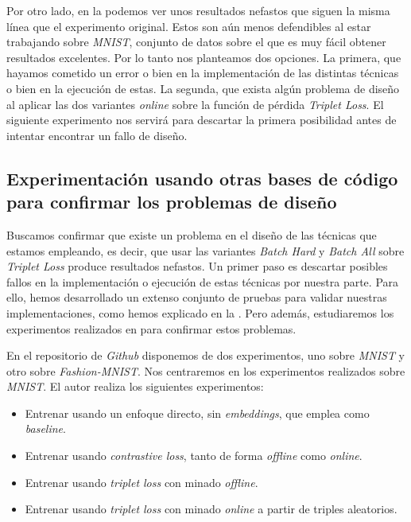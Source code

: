 Por otro lado, en la  podemos ver unos resultados nefastos que siguen la misma línea que el experimento original. Estos son aún menos defendibles al estar trabajando sobre \textit{MNIST}, conjunto de datos sobre el que es muy fácil obtener resultados excelentes. Por lo tanto nos planteamos dos opciones. La primera, que hayamos cometido un error o bien en la implementación de las distintas técnicas o bien en la ejecución de estas. La segunda, que exista algún problema de diseño al aplicar las dos variantes \textit{online} sobre la función de pérdida \textit{Triplet Loss}. El siguiente experimento nos servirá para descartar la primera posibilidad antes de intentar encontrar un fallo de diseño.

\subsection{Experimentación usando otras bases de código para confirmar los problemas de diseño} \label{isubsec:experiemntacion_base_codigo_externa}

Buscamos confirmar que existe un problema en el diseño de las técnicas que estamos empleando, es decir, que usar las variantes \textit{Batch Hard} y \textit{Batch All} sobre \textit{Triplet Loss} produce resultados nefastos. Un primer paso es descartar posibles fallos en la implementación o ejecución de estas técnicas por nuestra parte. Para ello, hemos desarrollado un extenso conjunto de pruebas para validar nuestras implementaciones, como hemos explicado en la . Pero además, estudiaremos los experimentos realizados en \cite{informatica:adambielski_github} para confirmar estos problemas.

En el repositorio de \textit{Github} \cite{informatica:adambielski_github} disponemos de dos experimentos, uno sobre \textit{MNIST} y otro sobre \textit{Fashion-MNIST}. Nos centraremos en los experimentos realizados sobre \textit{MNIST}. El autor realiza los siguientes experimentos:

\begin{itemize}
    \item Entrenar usando un enfoque directo, sin \textit{embeddings}, que emplea como \textit{baseline}.
    \item Entrenar usando \textit{contrastive loss}, tanto de forma \textit{offline} como \textit{online}.
    \item Entrenar usando \textit{triplet loss} con minado \textit{offline}.
    \item Entrenar usando \textit{triplet loss} con minado \textit{online} a partir de triples aleatorios.
\end{itemize}

